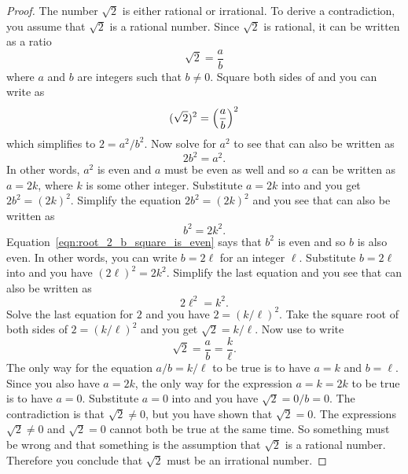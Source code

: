 \documentclass[a4paper,oneside,12pt]{article}
\begin{document}
\begin{proof}
The number $\sqrt{2}$ is either rational or irrational.  To derive a
contradiction, you assume that $\sqrt{2}$ is a rational number.  Since
$\sqrt{2}$ is rational, it can be written as a ratio
\begin{equation}
\label{eqn:root_2_as_ratio}
\sqrt{2}
=
\frac{a}{b}
\end{equation}
where $a$ and $b$ are integers such that $b \neq 0$.  Square both
sides of  and you can write
 as
\[
(\sqrt{2})^2
=
\parenthesis*{
  \frac{a}{b}
}^2
\]
which simplifies to $2 = a^2 / b^2$.  Now solve for $a^2$ to see that
 can also be written as
\begin{equation}
\label{eqn:root_2_a_square_is_even}
2b^2
=
a^2.
\end{equation}
In other words, $a^2$ is even and $a$ must be even as well and so $a$
can be written as $a = 2k$, where $k$ is some other integer.
Substitute $a = 2k$ into  and
you get $2b^2 = (2k)^2$.  Simplify the equation $2b^2 = (2k)^2$ and
you see that  can also be written as
\begin{equation}
\label{eqn:root_2_b_square_is_even}
b^2
=
2k^2.
\end{equation}
Equation~\eqref{eqn:root_2_b_square_is_even} says that $b^2$ is even
and so $b$ is also even.  In other words, you can write $b = 2\ell$
for an integer $\ell$.  Substitute $b = 2\ell$ into
 and you have
$(2\ell)^2 = 2k^2$.  Simplify the last equation and you see that
 can also be written as
\[
2\ell^2
=
k^2.
\]
Solve the last equation for $2$ and you have $2 = (k / \ell)^2$.  Take
the square root of both sides of $2 = (k / \ell)^2$ and you get
$\sqrt{2} = k / \ell$.  Now use  to
write
\[
\sqrt{2}
=
\frac{a}{b}
=
\frac{k}{\ell}.
\]
The only way for the equation $a/b = k / \ell$ to be true is to have
$a = k$ and $b = \ell$.  Since you also have $a = 2k$, the only way
for the expression $a = k = 2k$ to be true is to have $a = 0$.
Substitute $a = 0$ into  and you have
$\sqrt{2} = 0 / b = 0$.  The contradiction is that $\sqrt{2} \neq 0$,
but you have shown that $\sqrt{2} = 0$.  The expressions
$\sqrt{2} \neq 0$ and $\sqrt{2} = 0$ cannot both be true at the same
time.  So something must be wrong and that something is the assumption
that $\sqrt{2}$ is a rational number.  Therefore you conclude that
$\sqrt{2}$ must be an irrational number.
\end{proof}
\end{document}
